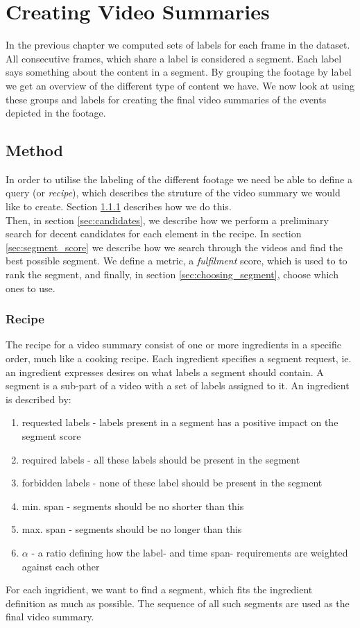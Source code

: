 %
\chapter{Creating Video Summaries}\label{chp:video_summaries}
%
In the previous chapter we computed sets of labels for each frame in the dataset. All consecutive frames, which share a label is considered a segment. Each label says something about the content in a segment. By grouping the footage by label we get an overview of the different type of content we have. We now look at using these groups and labels for creating the final video summaries of the events depicted in the footage. 
%
\section{Method}
%
In order to utilise the labeling of the different footage we need be able to define a query (or \textit{recipe}), which describes the struture of the video summary we would like to create. Section \ref{sec:recipe} describes how we do this.\\
Then, in section \ref{sec:candidates}, we describe how we perform a preliminary search for decent candidates for each element in the recipe. In section \ref{sec:segment_score} we describe how we search through the videos and find the best possible segment. We define a metric, a \textit{fulfilment} score, which is used to to rank the segment, and finally, in section \ref{sec:choosing_segment}, choose which ones to use.
%
\subsection{Recipe}\label{sec:recipe}
%
The recipe for a video summary consist of one or more ingredients in a specific order, much like a cooking recipe. Each ingredient specifies a segment request, ie. an ingredient expresses desires on what labels a segment should contain. A segment is a sub-part of a video with a set of labels assigned to it. An ingredient is described by:
%
\begin{enumerate}
	\item requested labels - labels present in a segment has a positive impact on the segment score
	\item required labels - all these labels should be present in the segment
	\item forbidden labels - none of these label should be present in the segment
	\item min. span - segments should be no shorter than this
	\item max. span - segments should be no longer than this
	\item $\alpha$  - a ratio defining how the label- and time span- requirements are weighted against each other
\end{enumerate}
%
For each ingridient, we want to find a segment, which fits the ingredient definition as much as possible. The sequence of all such segments are used as the final video summary.
%
